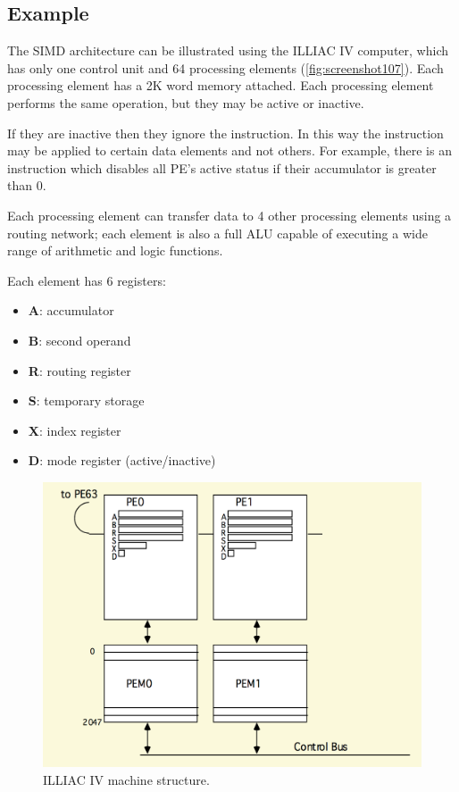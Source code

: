 \subsection{Example}
The SIMD architecture can be illustrated using the ILLIAC IV computer, which has only one control unit and 64 processing elements (\autoref{fig:screenshot107}). Each processing element has a 2K word memory attached. Each processing element performs the same operation, but they may be active or inactive. 

If they are inactive then they ignore the instruction. In this way the instruction may be applied to certain data elements and not others. For example, there is an instruction which disables all PE's active status if their accumulator is greater than 0.

Each processing element can transfer data to 4 other processing elements using a routing network; each element is also a full ALU capable of executing a wide range of arithmetic and logic functions. 

Each element has 6 registers: \begin{itemize}
\item \textbf{A}: accumulator 
\item \textbf{B}: second operand  
\item \textbf{R}: routing register 
\item \textbf{S}: temporary storage 
\item \textbf{X}: index register 
\item \textbf{D}: mode register (active/inactive) 
\end{itemize}

\begin{figure}
\centering
\includegraphics[width=0.7\linewidth]{screenshot107}
\caption{ILLIAC IV machine structure.}
\label{fig:screenshot107}
\end{figure}

